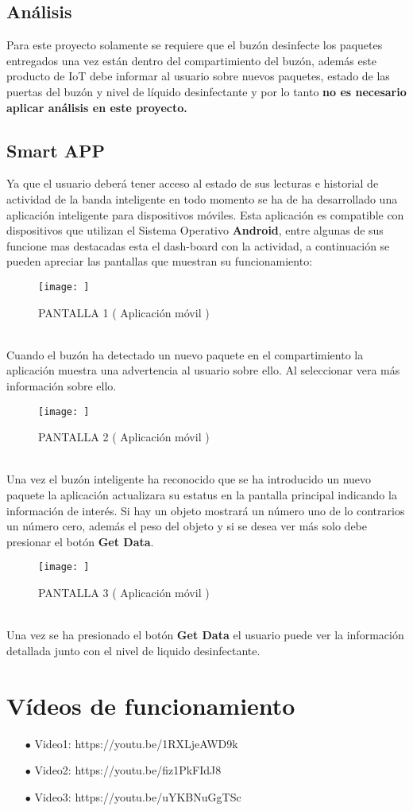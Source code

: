 \documentclass[osajnl,twocolumn,showpacs,superscriptaddress,10pt]{revtex4-1}
\begin{document}
\subsection{Análisis}
    Para este proyecto solamente se requiere que el buzón desinfecte los paquetes entregados una vez están dentro del compartimiento del buzón, además este producto de IoT debe informar al usuario sobre nuevos paquetes, estado de las puertas del buzón y nivel de líquido desinfectante y por lo tanto \textbf{no es necesario aplicar análisis en este proyecto.}
\subsection{Smart APP}
    Ya que el usuario deberá tener acceso al estado de sus lecturas e historial de actividad de la banda inteligente en todo momento se ha de ha desarrollado una aplicación inteligente para dispositivos móviles. Esta aplicación es compatible con dispositivos que utilizan el Sistema Operativo \textbf{Android}, entre algunas de sus funcione mas destacadas esta el dash-board con la actividad, a continuación se pueden apreciar las pantallas que muestran su funcionamiento:
    
\begin{figure} [H] \centering 
\caption{PANTALLA 1 ( Aplicación móvil )}
\texttt{[image: ]} 
\end{figure}
\\
Cuando el buzón ha detectado un nuevo paquete en el compartimiento la aplicación muestra una advertencia al usuario sobre ello. Al seleccionar vera más información sobre ello.

\begin{figure} [H] \centering 
\caption{PANTALLA 2 ( Aplicación móvil )}
\texttt{[image: ]} 
\end{figure}
\\
Una vez el buzón inteligente ha reconocido que se ha introducido un nuevo paquete la aplicación actualizara su estatus en la pantalla principal indicando la información de interés. Si hay un objeto mostrará un número uno de lo contrarios un número cero, además el peso del objeto y si se desea ver más solo debe presionar el botón \textbf{Get Data}.

\begin{figure} [H] \centering 
\caption{PANTALLA 3 ( Aplicación móvil )}
\texttt{[image: ]} 
\end{figure}
\\
Una vez se ha presionado el botón \textbf{Get Data}  el usuario puede ver la información detallada junto con el nivel de liquido desinfectante.

\section{Vídeos de funcionamiento}
\begin{itemize}
    \item[$\bullet$]Video1: https://youtu.be/1RXLjeAWD9k 
    \item[$\bullet$]Video2: https://youtu.be/fiz1PkFIdJ8
    \item[$\bullet$]Video3: https://youtu.be/uYKBNuGgTSc
\end{itemize}
\end{document}
